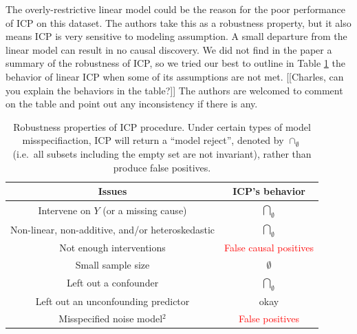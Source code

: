 \documentclass{article}
\begin{document}
The overly-restrictive linear model could be the reason for the poor
performance of ICP on this dataset. The authors take this as a
robustness property, but it also means ICP is very sensitive to
modeling assumption. A small departure from the linear
model can result in no causal discovery. We did not find in the paper a
summary of the robustness of ICP, so we tried our best to outline in
Table \ref{tab:icp} the behavior of linear ICP when some of its
assumptions are not met. [[Charles, can you explain the
{\color{red} behaviors} in the table?]] The authors are welcomed to
comment on the table and point out any inconsistency if there is any.

\begin{table}[h]
\centering
  \begin{tabular}{|c|c|}
    \hline
    \textbf{Issues} & \textbf{ICP's behavior} \\
    \hline
    Intervene on $Y$ (or a missing cause) &
    $\underset{\emptyset}{\bigcap}$ \\
    \hline
    Non-linear, non-additive, and/or heteroskedastic &
    $\underset{\emptyset}{\bigcap}$ \\
    \hline
    Not enough interventions &
    \textcolor{red}{False causal positives} \\
    \hline
    Small sample size &
    $\emptyset$ \\
    \hline
    Left out a confounder & $\underset{\emptyset}{\bigcap}$ \\
    \hline
    Left out an unconfounding predictor & okay  \\
    \hline
    Misspecified noise model$^2$ & \textcolor{red}{False positives}\\\hline
  \end{tabular}
\caption{Robustness properties of ICP procedure.  Under certain types
  of model misspecifiaction, ICP will return a ``model reject'',
  denoted by $\cap_{\emptyset}$ (i.e.\ all subsets including the empty
  set are not invariant), rather than produce false positives.}
\label{tab:icp}
\end{table}



\end{document}
